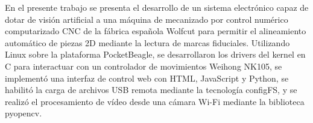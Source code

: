 En el presente trabajo se presenta el desarrollo de un sistema electrónico capaz de dotar de visión artificial a una máquina de mecanizado por control numérico computarizado CNC de la fábrica española Wolfcut para permitir el alineamiento automático de piezas 2D mediante la lectura de marcas fiduciales.
Utilizando Linux sobre la plataforma PocketBeagle, se desarrollaron los drivers del kernel en C para interactuar con un controlador de movimientos Weihong NK105, se implementó una interfaz de control web con HTML, JavaScript y Python, se habilitó la carga de archivos USB remota mediante la tecnología configFS, y se realizó el procesamiento de vídeo desde una cámara Wi-Fi mediante la biblioteca pyopencv.
